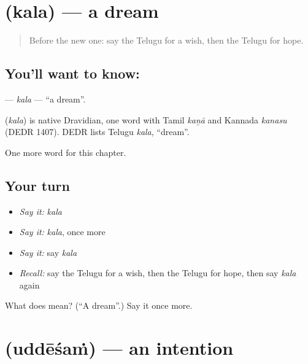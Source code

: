 \section[\texorpdfstring{\te{కల} (kala)}{కల (kala)}]{ (kala) — a dream}

\label{lesson:TE-C107-kala}



\begin{quote}
Before the new one: say the Telugu for a wish, then the Telugu for hope.
\end{quote}

\subsection*{You'll want to know: }
\textbf{} — \emph{kala} — \textquotedblleft{}a dream\textquotedblright{}.

\begin{cousinweb}
\textbf{} (\emph{kala}) is native Dravidian, one word with Tamil \emph{kaṉā} and Kannada \emph{kanasu} (DEDR 1407). DEDR lists Telugu \emph{kala}, \textquotedblleft{}dream\textquotedblright{}.
\end{cousinweb}

\begin{grammarlens}[title={What you've built}]
One more word for this chapter.
\end{grammarlens}

\subsection*{Your turn}
\begin{itemize}
\raggedright
  \item \emph{Say it:} \emph{kala}
  \item \emph{Say it:} \emph{kala}, once more
  \item \emph{Say it:} say \emph{kala}
  \item \emph{Recall:} say the Telugu for a wish, then the Telugu for hope, then say \emph{kala} again
\end{itemize}

\begin{tcolorbox}[breakable,colback=teal!4,colframe=teal!35!black,title={Before you move on}]
What does  mean? (\textquotedblleft{}A dream\textquotedblright{}.) Say it once more.
\end{tcolorbox}
\section[\texorpdfstring{\te{ఉద్దేశం} (uddēśaṁ)}{ఉద్దేశం (uddēśaṁ)}]{ (uddēśaṁ) — an intention}

